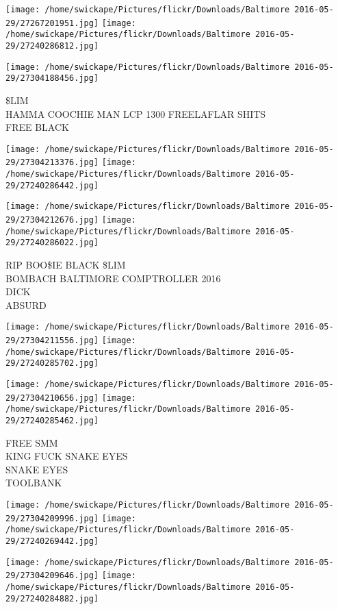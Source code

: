 \documentclass[10pt,letterpaper]{article}
\begin{document}
\texttt{[image: /home/swickape/Pictures/flickr/Downloads/Baltimore 2016-05-29/27267201951.jpg]}
\texttt{[image: /home/swickape/Pictures/flickr/Downloads/Baltimore 2016-05-29/27240286812.jpg]}

\vspace{0.25in}
\texttt{[image: /home/swickape/Pictures/flickr/Downloads/Baltimore 2016-05-29/27304188456.jpg]}

\$LIM\\
HAMMA COOCHIE MAN LCP 1300 FREELAFLAR SHITS\\
FREE BLACK
\pagebreak

\texttt{[image: /home/swickape/Pictures/flickr/Downloads/Baltimore 2016-05-29/27304213376.jpg]}
\texttt{[image: /home/swickape/Pictures/flickr/Downloads/Baltimore 2016-05-29/27240286442.jpg]}

\texttt{[image: /home/swickape/Pictures/flickr/Downloads/Baltimore 2016-05-29/27304212676.jpg]}
\texttt{[image: /home/swickape/Pictures/flickr/Downloads/Baltimore 2016-05-29/27240286022.jpg]}

RIP BOO\$IE BLACK \$LIM\\
BOMBACH BALTIMORE COMPTROLLER 2016\\
DICK\\
ABSURD
\pagebreak

\texttt{[image: /home/swickape/Pictures/flickr/Downloads/Baltimore 2016-05-29/27304211556.jpg]}
\texttt{[image: /home/swickape/Pictures/flickr/Downloads/Baltimore 2016-05-29/27240285702.jpg]}

\texttt{[image: /home/swickape/Pictures/flickr/Downloads/Baltimore 2016-05-29/27304210656.jpg]}
\texttt{[image: /home/swickape/Pictures/flickr/Downloads/Baltimore 2016-05-29/27240285462.jpg]}

FREE SMM\\
KING FUCK SNAKE EYES\\
SNAKE EYES\\
TOOLBANK
\pagebreak

\texttt{[image: /home/swickape/Pictures/flickr/Downloads/Baltimore 2016-05-29/27304209996.jpg]}
\texttt{[image: /home/swickape/Pictures/flickr/Downloads/Baltimore 2016-05-29/27240269442.jpg]}

\texttt{[image: /home/swickape/Pictures/flickr/Downloads/Baltimore 2016-05-29/27304209646.jpg]}
\texttt{[image: /home/swickape/Pictures/flickr/Downloads/Baltimore 2016-05-29/27240284882.jpg]}
\end{document}
